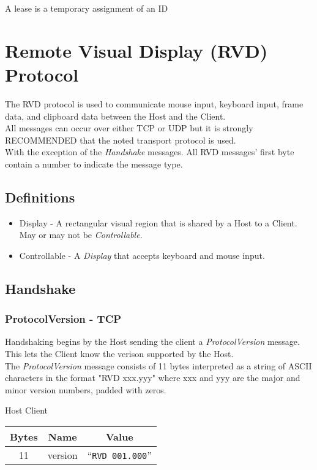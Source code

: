 \documentclass{article}
\begin{document}
    A lease is a temporary assignment of an ID

    \newpage


    \section{Remote Visual Display (RVD) Protocol}

    The RVD protocol is used to communicate mouse input, keyboard input, frame data, and clipboard data between the Host and the Client.\\

    All messages can occur over either TCP or UDP but it is strongly RECOMMENDED that the noted transport protocol is used.\\

    With the exception of the \emph{Handshake} messages. All RVD messages' first byte contain a number to indicate the message type.

    \subsection{Definitions}

    \begin{itemize}
        \item Display - A rectangular visual region that is shared by a Host to a Client. May or may not be \emph{Controllable}.
        \item Controllable - A \emph{Display} that accepts keyboard and mouse input.
    \end{itemize}

    \subsection{Handshake}

    \subsubsection{ProtocolVersion - TCP}
    Handshaking begins by the Host sending the client a \emph{ProtocolVersion} message. This lets the Client know the verison supported by the Host.\\

    The \emph{ProtocolVersion} message consists of 11 bytes interpreted as a string of ASCII characters in the format "RVD xxx.yyy" where xxx and yyy are the major and minor version numbers, padded with zeros.

    \begin{center}
        Host \textrightarrow Client\\
        \begin{tabular}{|c|c|c|}
            \hline
            \textbf{Bytes} & \textbf{Name} & \textbf{Value}           \\
            \hline
            11             & version       & ``\texttt{RVD 001.000}'' \\
            \hline
        \end{tabular}
    \end{center}
\end{document}
